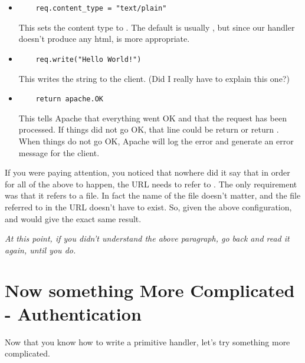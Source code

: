 \begin{enumerate}
\begin{itemize}
\item
\begin{verbatim}
    req.content_type = "text/plain"
\end{verbatim}

This sets the content type to . The default is usually
, but since our handler doesn't produce any html,
 is more appropriate.

\item
\begin{verbatim}
    req.write("Hello World!")
\end{verbatim}

This writes the  string to the client. (Did I really
have to explain this one?)

\item
\begin{verbatim}
    return apache.OK
\end{verbatim}

This tells Apache that everything went OK and that the request has
been processed. If things did not go OK, that line could be return
 or return
. When things do not go OK, Apache
will log the error and generate an error message for the client.
\end{itemize}
\end{enumerate}

 If you were paying attention, you noticed that
nowhere did it say that in order for all of the above to happen, the
URL needs to refer to . The only requirement was
that it refers to a  file. In fact the name of the file doesn't
matter, and the file referred to in the URL doesn't have to exist. So,
given the above configuration,
 and
 would give the exact same
result.

 \emph{At this point, if you didn't understand the above paragraph, go back and read it again, until you do.}

\section{Now something More Complicated - Authentication\label{tut-more-complicated}}

Now that you know how to write a primitive handler, let's try
something more complicated.

